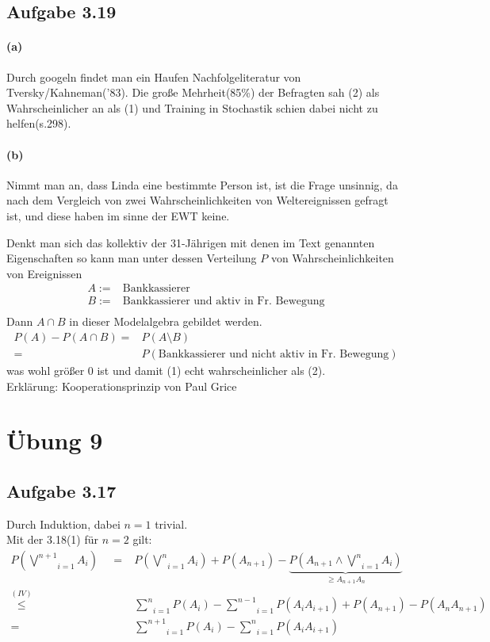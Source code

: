 \documentclass[10pt, a4paper]{article}
\begin{document}
\subsection{Aufgabe 3.19}
\paragraph*{(a)} Durch googeln findet man ein Haufen Nachfolgeliteratur von Tversky/Kahneman('83). Die große Mehrheit(85\%) der Befragten sah (2) als Wahrscheinlicher an als (1) und Training in Stochastik schien dabei nicht zu helfen(s.298).

\paragraph{(b)}Nimmt man an, dass Linda eine bestimmte Person ist, ist die Frage unsinnig, da nach dem Vergleich von zwei Wahrscheinlichkeiten von Weltereignissen gefragt ist, und diese haben im sinne der EWT keine.

Denkt man sich das kollektiv der 31-Jährigen mit denen im Text genannten Eigenschaften so kann man unter dessen Verteilung $P$ von Wahrscheinlichkeiten von Ereignissen 
\begin{align*}
	A:=&\text{Bankkassierer}	\\
	B:=&\text{Bankkassierer und aktiv in Fr. Bewegung}	\\
\end{align*}
Dann $A\cap B$ in dieser Modelalgebra gebildet werden.
\begin{align*}
	P(A)-P(A\cap B)=&P(A\setminus B)	\\
	=&P(\text{Bankkassierer und nicht aktiv in Fr. Bewegung})
\end{align*}
was wohl größer 0 ist und damit (1) echt wahrscheinlicher als (2).	\\
Erklärung: Kooperationsprinzip von Paul Grice



\section{Übung 9}
\subsection{Aufgabe 3.17}
Durch Induktion, dabei $n=1$ trivial.\\
Mit der 3.18(1) für $n=2$ gilt: 
\begin{align*}
	P(\underset{i=1}{\stackrel{n+1}{\bigvee}}A_{i})~~~~~=&P(\underset{i=1}{\stackrel{n}{\bigvee}}A_{i})+P(A_{n+1})-\underbrace{P(A_{n+1}\wedge \underset{i=1}{\stackrel{n}{\bigvee}}A_{i})}_{\geq A_{n+1}A_{n}}	\\
	\stackrel{(IV)}{\leq}& \underset{i=1}{\stackrel{n}{\sum}}P(A_{i})-\underset{i=1}{\stackrel{n-1}{\sum}}P(A_{i}A_{i+1})+P(A_{n+1})-P(A_{n}A_{n+1})	\\
	=&\underset{i=1}{\stackrel{n+1}{\sum}}P(A_{i})-\underset{i=1}{\stackrel{n}{\sum}}P(A_{i}A_{i+1})	\\
\end{align*}
\end{document}
